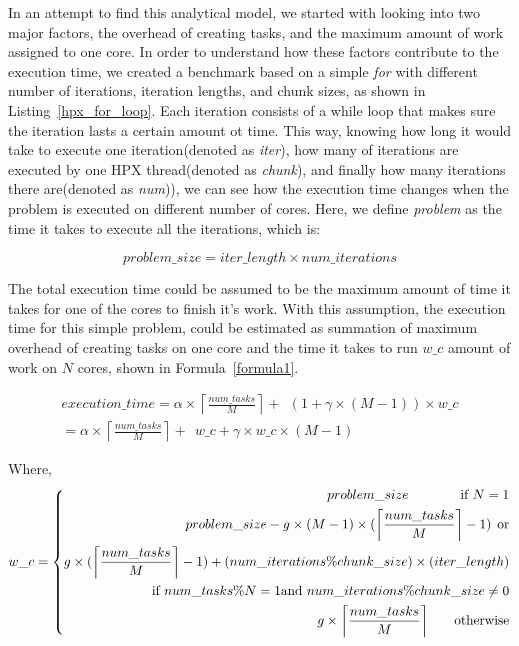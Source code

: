In an attempt to find this analytical model, we started with looking into two major factors, the overhead of creating tasks, and the maximum amount of work assigned to one core. 
In order to understand how these factors contribute to the execution time, we created a benchmark based on a simple \textit{for} with different number of iterations, iteration lengths, and chunk sizes, as shown in Listing~\ref{hpx_for_loop}. 
Each iteration consists of a while loop that makes sure the iteration lasts a certain amount ot time. This way, knowing how long it would take to execute one iteration(denoted as \textit{iter}), how many of iterations are executed by one HPX thread(denoted as \textit{chunk}), and finally how many iterations there are(denoted as \textit{num})), we can see how the execution time changes when the problem is executed on different number of cores. Here, we define \textit{problem} as the time it takes to execute all the iterations, which is:

\begin{equation}\label{problem_size}
problem\_size = iter\_length\times{num\_iterations}
\end{equation}

The total execution time could be assumed to be the maximum amount of time it takes for one of the cores to finish it's work. With this assumption, the execution time for this simple problem, could be estimated as summation of maximum overhead of creating tasks on one core and the time it takes to run $w\_c$ amount of work on $N$ cores, shown in Formula~\ref{formula1}.

\begin{equation}\label{formula1}
\begin{aligned}
execution\_time = \alpha\times\left \lceil{\frac{num\_{tasks}}{M}}\right \rceil +\:\:{(1+\gamma\times{(M-1)})\times{w\_c}}\\
=\alpha\times\left \lceil{\frac{num\_{tasks}}{M}}\right \rceil +\:\:{w\_c+\gamma\times{w\_c}\times{(M-1)}}
\end{aligned}
\end{equation}

Where, 
\begin{equation}\label{formula2}
w\_c =\left\{
\begin{aligned}
problem\_{size} \:\:\:\:\:\:\:\:\:\:\:\:\:\:\:\:        \text{ if } N=1\\
problem\_{size}-g\times{(M-1)}\times(\left \lceil{\frac{num\_{tasks}}{M}}\right \rceil-1) \text{\:\:or} \\
g\times(\left \lceil{\frac{num\_{tasks}}{M}}\right \rceil-1)+(num\_{iterations}\%chunk\_{size})\times(iter\_{length}) \\ \:\:\:\:\:\:\:\:       \text{if }num\_{tasks}\%N=1\text{and }num\_{iterations}\%chunk\_{size}\neq0\\
g\times\left \lceil{\frac{num\_{tasks}}{M}}\right \rceil  \:\:\:\:\:\:\:\:       \text{otherwise}
\end{aligned}
\right.
\end{equation}

